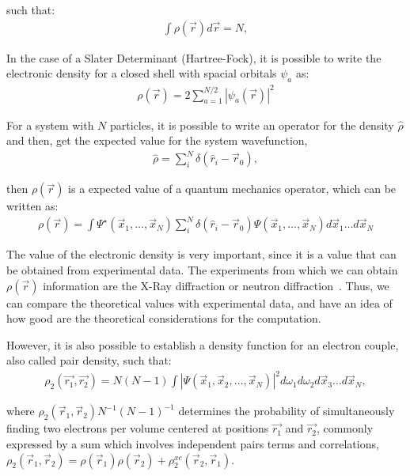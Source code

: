 \noindent such that:
%
\begin{align}
  \int\rho (\vec{r})d\vec{r} =N ,
\end{align}

\noindent In the case of a Slater Determinant (Hartree-Fock), it is possible to write
the electronic density for a closed shell with spacial orbitals ${\psi_a}$ as:
%
\begin{align}
  \rho (\vec{r}) = 2 \sum_{a=1}^{N/2} |\psi_a (\vec{r})|^2 
\end{align}

For a system with $N$ particles, it is possible to write an operator for the
density $\hat{\rho}$ and then, get the expected value for the system
wavefunction,
%
\begin{align}
  \hat{\rho} = \sum_i ^N \delta (\hat{r}_i - \vec{r}_0),
\end{align}

\noindent then $\rho (\vec{r})$ is a expected value of a quantum mechanics
operator, which can be written as:
%
\begin{align}
  \rho (\vec{r})= \int\Psi^{\star} (\vec{x}_1, \ldots , \vec{x}_N)
  \sum_i ^N \delta (\hat{r}_i - \vec{r}_0) \Psi (\vec{x}_1, \ldots , \vec{x}_N)
  d\vec{x}_1 \ldots d\vec{x}_N 
\end{align}

The value of the electronic density is very important, since it is a value that
can be obtained from experimental data. The experiments from which we can
obtain $\rho (\vec{r})$ information are the X-Ray diffraction or neutron
diffraction~\cite{Kasai2018, Coppens1971}.  Thus, we can compare the
theoretical values with experimental data, and have an idea of how good are the
theoretical considerations for the computation.

However, it is also possible to establish a density function for an electron
couple, also called pair density, such that:
%
\begin{align}
  \rho_2(\vec{r_1},\vec{r_2})=N(N-1)\int |\Psi (\vec{x}_1 ,  \vec{x}_2,  \ldots , \vec{x}_N)|^2
  d\omega_1 d\omega_2  d\vec{x}_3 \ldots d\vec{x}_N ,
\label{d_pares}
\end{align}

\noindent where $\rho_2(\vec{r}_1,\vec{r}_2)N^{-1}(N-1)^{-1}$ determines the
probability of simultaneously finding two electrons per volume centered at
positions $\vec{r_1}$ and $\vec{r_2}$, commonly expressed by a sum which
involves independent pairs terms and correlations, $\rho_2(\vec{r}_1,
\vec{r}_2) = \rho(\vec{r}_1)\rho(\vec{r}_2) + \rho_2^{xc}(\vec{r}_2,
\vec{r}_1)$.

